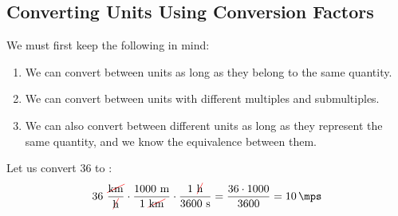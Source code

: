 
\subsection{Converting Units Using Conversion Factors}

We must first keep the following in mind:
\begin{enumerate}[label=\letraminuscula]
        \item We can convert between units as long as they belong to the same quantity.
        \item We can convert between units with different multiples and submultiples.
        \item We can also convert between different units as long as they represent the same quantity, and we know the equivalence between them.
\end{enumerate}

\begin{example}
    Let us convert \qty{36}{\kmph} to \unit{\mps}:
    \begin{equation*}
        36\ \dfrac{\cancelred{\unit{\kilo\metre}}}{\cancel{\unit{\hour}}} \cdot \dfrac{1000\ \unit{\metre}}{1\ \cancelred{\unit{\kilo\metre}}} \cdot \dfrac{1\ \cancelred{\unit{\hour}}}{3600\ \unit{\second}} = \dfrac{36 \cdot 1000}{3600} = \qty{10}{\mps}
    \end{equation*}
\end{example}

